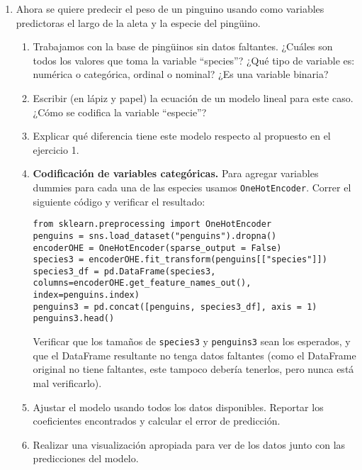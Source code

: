 \documentclass[a4paper,11pt]{article}
\theoremstyle{definition}
\begin{document}
\begin{enumerate}
\item Ahora se quiere predecir el peso de un pinguino usando como variables predictoras el largo de la aleta y la especie del ping\"uino.
\begin{enumerate}
\item Trabajamos con la base de ping\"uinos sin datos faltantes. ¿Cu\'ales son todos los valores que toma la variable ``species''? ¿Qu\'e tipo de variable es: numérica o categórica, ordinal o nominal? ¿Es una variable binaria?
\item Escribir (en lápiz y papel) la ecuación de un modelo lineal para este caso. ¿Cómo se codifica la variable “especie”?
\item Explicar qué diferencia tiene este modelo respecto al propuesto en el ejercicio 1.
\item \textbf{Codificación de variables categóricas.} Para agregar variables dummies para cada una de las especies usamos \lstinline{OneHotEncoder}. Correr el siguiente c\'odigo y verificar el resultado:
\begin{lstlisting}
from sklearn.preprocessing import OneHotEncoder
penguins = sns.load_dataset("penguins").dropna()
encoderOHE = OneHotEncoder(sparse_output = False)
species3 = encoderOHE.fit_transform(penguins[["species"]])
species3_df = pd.DataFrame(species3, columns=encoderOHE.get_feature_names_out(), index=penguins.index)
penguins3 = pd.concat([penguins, species3_df], axis = 1)
penguins3.head()
\end{lstlisting}

Verificar que los tama\~nos de \lstinline{species3} y \lstinline{penguins3} sean los esperados, y que el DataFrame resultante no tenga datos faltantes (como el DataFrame original no tiene faltantes, este tampoco debería tenerlos, pero nunca está mal verificarlo).

\item Ajustar el modelo usando todos los datos disponibles. Reportar los coeficientes encontrados y calcular el error de predicción.
\item Realizar una visualización apropiada para ver de los datos junto con las predicciones del modelo.
\end{enumerate}

\end{enumerate}
\end{document}
